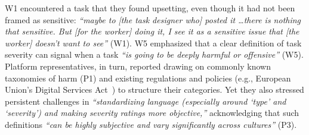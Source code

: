 W1 encountered a task that they found upsetting, even though it had not been framed as sensitive: \textit{``maybe to [the task designer who] posted it \dots there is nothing that sensitive. But [for the worker] doing it, I see it as a sensitive issue that [the worker] doesn't want to see''} (W1). W5 emphasized that a clear definition of task severity can signal when a task \textit{``is going to be deeply harmful or offensive''} (W5). Platform representatives, in turn, reported drawing on commonly known taxonomies of harm (P1) and existing regulations and policies (e.g., European Union's Digital Services Act~\cite{EU-DSA-2022}) to structure their categories. Yet they also stressed persistent challenges in \textit{``standardizing language (especially around `type' and `severity') and making severity ratings more objective,''} acknowledging that such definitions \textit{``can be highly subjective and vary significantly across cultures''} (P3). 




